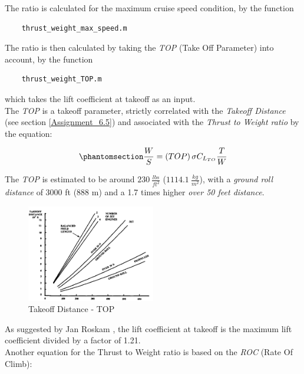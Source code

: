 \documentclass{article}
\begin{document}
The ratio is calculated for the maximum cruise speed condition, by the function 
\begin{verbatim}
    thrust_weight_max_speed.m
\end{verbatim}


The ratio is then calculated by taking the \textit{TOP} (Take Off Parameter) into account, by the function 
\begin{verbatim}
    thrust_weight_TOP.m
\end{verbatim}
which takes the lift coefficient at takeoff as an input.\\ 

The \textit{TOP} is a takeoff parameter, strictly correlated with the \textit{Takeoff Distance} (see section \ref{Assignment_6.5}) and associated
with the \textit{Thrust to Weight ratio} by the equation:

\begin{equation}
    \phantomsection
    \label{thrust_weight_equation_TOP}
    \frac{W}{S} = \left(TOP\right)\sigma C_{L_{TO}} \frac{T}{W} 
\end{equation}

The \textit{TOP} is estimated to be around $230 \ \frac{lbs}{ft^2}$ ($1114.1 \ \frac{kg}{m^2}$), with a \textit{ground roll distance}
of 3000 ft (888 m) and a 1.7 times higher \textit{over 50 feet distance}.\\ 

\begin{figure}[h!]
    \centering
    \includegraphics[width=0.5\textwidth]{Sources/Plots_and_Pictures/TOP.png}
    \caption{Takeoff Distance - TOP \autocite{Raymer_Daniel}}
    \label{TOP}
\end{figure}
As suggested by Jan Roskam \autocite{Roskam}, the lift coefficient at takeoff is the maximum lift coefficient
divided by a factor of 1.21. \\ 

Another equation for the Thrust to Weight ratio is based on the \textit{ROC} (Rate Of Climb):
\end{document}
